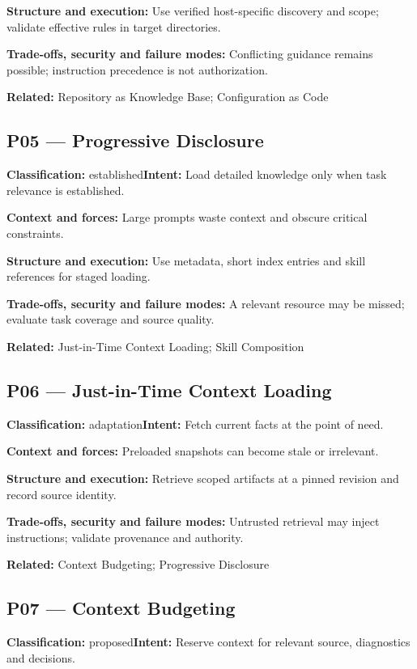 \documentclass[11pt,letterpaper]{article}
\begin{document}
\textbf{Structure and execution:} Use verified host-specific discovery and scope; validate effective rules in target directories.

\textbf{Trade-offs, security and failure modes:} Conflicting guidance remains possible; instruction precedence is not authorization.

\textbf{Related:} Repository as Knowledge Base; Configuration as Code

\subsection*{P05 --- Progressive Disclosure}
\textbf{Classification:} established\quad\textbf{Intent:} Load detailed knowledge only when task relevance is established.

\textbf{Context and forces:} Large prompts waste context and obscure critical constraints.

\textbf{Structure and execution:} Use metadata, short index entries and skill references for staged loading.

\textbf{Trade-offs, security and failure modes:} A relevant resource may be missed; evaluate task coverage and source quality.

\textbf{Related:} Just-in-Time Context Loading; Skill Composition

\subsection*{P06 --- Just-in-Time Context Loading}
\textbf{Classification:} adaptation\quad\textbf{Intent:} Fetch current facts at the point of need.

\textbf{Context and forces:} Preloaded snapshots can become stale or irrelevant.

\textbf{Structure and execution:} Retrieve scoped artifacts at a pinned revision and record source identity.

\textbf{Trade-offs, security and failure modes:} Untrusted retrieval may inject instructions; validate provenance and authority.

\textbf{Related:} Context Budgeting; Progressive Disclosure

\subsection*{P07 --- Context Budgeting}
\textbf{Classification:} proposed\quad\textbf{Intent:} Reserve context for relevant source, diagnostics and decisions.
\end{document}
